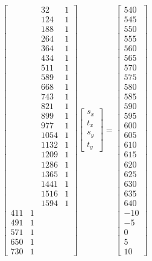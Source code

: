 \documentclass[a4paper]{article}
\begin{document}
\begin{equation}
	\begin{bmatrix}
		 & & 32 & 1\\
		 & & 124 & 1\\
		 & & 188 & 1\\
		 & & 264 & 1\\
		 & & 364 & 1\\
		 & & 434 & 1\\
		 & & 511 & 1\\
		 & & 589 & 1\\
		 & & 668 & 1\\
		 & & 743 & 1\\
		 & & 821 & 1\\
		 & & 899 & 1\\
		 & & 977 & 1\\
		 & & 1054 & 1\\
		 & & 1132 & 1\\
		 & & 1209 & 1\\
		 & & 1286 & 1\\
		 & & 1365 & 1\\
		 & & 1441 & 1\\
		 & & 1516 & 1\\
		 & & 1594 & 1\\
		 411 & 1 & &\\
		 491 & 1 & &\\
		 571 & 1 & &\\
		 650 & 1 & &\\
		 730 & 1 & &
	\end{bmatrix}
	\begin{bmatrix}
		s_x\\t_x\\s_y\\t_y
	\end{bmatrix}
	=
	\begin{bmatrix}
		540\\545\\550\\555\\560\\565\\570\\575\\580\\585\\590\\595\\600\\605\\610\\615\\620\\625\\630\\635\\640\\-10\\-5\\0\\5\\10
	\end{bmatrix}
\end{equation}
\end{document}
